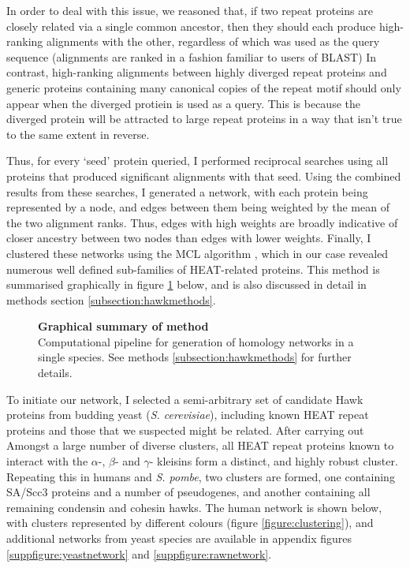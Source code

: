 \documentclass[a4paper,11pt,twoside,openright]{scrbook}
\begin{document}
In order to deal with this issue, we reasoned that, if two repeat proteins are closely related via a single common ancestor, then they should each produce high-ranking alignments with the other, regardless of which was used as the query sequence (alignments are ranked in a fashion familiar to users of BLAST) In contrast, high-ranking alignments between highly diverged repeat proteins and generic proteins containing many canonical copies of the repeat motif should only appear when the diverged protiein is used as a query. This is because the diverged protein will be attracted to large repeat proteins in a way that isn't true to the same extent in reverse.

Thus, for every `seed' protein queried, I performed reciprocal searches using all proteins that produced significant alignments with that seed. Using the combined results from these searches, I generated a network, with each protein being represented by a node, and edges between them being weighted by the mean of the two alignment ranks. Thus, edges with high weights are broadly indicative of closer ancestry between two nodes than edges with lower weights. Finally, I clustered these networks using the MCL algorithm \cite{VanDongen2000}, which in our case revealed numerous well defined sub-families of HEAT-related proteins. This method is summarised graphically in figure \ref{figure:hawkmethod} below, and is also discussed in detail in methods section \ref{subsection:hawkmethods}.

\begin{figure}[h]
    \caption[Graphical summary of method]{\sffamily \textbf{Graphical summary of method} \\ \small Computational pipeline for generation of homology networks in a single species. See methods \ref{subsection:hawkmethods} for further details.}
    \label{figure:hawkmethod}
\end{figure}

To initiate our network, I selected a semi-arbitrary set of candidate Hawk proteins from budding yeast (\textit{S. cerevisiae}), including known HEAT repeat proteins and those that we suspected might be related. After carrying out Amongst a large number of diverse clusters, all HEAT repeat proteins known to interact with the $\alpha$-, $\beta$- and $\gamma$- kleisins \cite{Nasmyth2009, Hirano2016} form a distinct, and highly robust cluster. Repeating this in humans and \textit{S. pombe}, two clusters are formed, one containing SA/Scc3 proteins and a number of pseudogenes, and another containing all remaining condensin and cohesin hawks. The human network is shown below, with clusters represented by different colours (figure \ref{figure:clustering}), and additional networks from yeast species are available in appendix figures \ref{suppfigure:yeastnetwork} and \ref{suppfigure:rawnetwork}.
\end{document}
